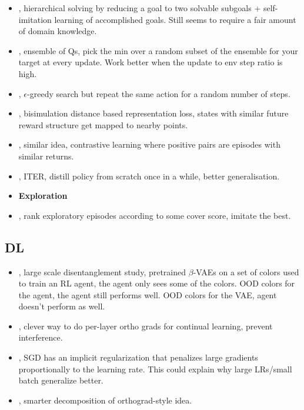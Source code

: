 \begin{itemize}
\item \citet{li2021solving}, hierarchical solving by reducing a goal to two solvable subgoals + self-imitation learning of accomplished goals. Still seems to require a fair amount of domain knowledge.
\item \citet{chen2021randomized}, ensemble of Qs, pick the min over a random subset of the ensemble for your target at every update. Work better when the update to env step ratio is high.
\item \citet{dabney2021temporallyextended}, $\epsilon$-greedy search but repeat the same action for a random number of steps.
\item \citet{zhang2021learning}, bisimulation distance based representation loss, states with similar future reward structure get mapped to nearby points.
  \item \citet{liu2021returnbased}, similar idea, contrastive learning where positive pairs are episodes with similar returns.
\item \citet{igl2021transient}, ITER, distill policy from scratch once in a while, better generalisation.
  
\item \textbf{Exploration}
\item \citet{zha2021rank}, rank exploratory episodes according to some cover score, imitate the best.
\end{itemize}

\subsection{DL}

\begin{itemize}
\item \citet{dittadi2021on}, large scale disentanglement study, pretrained $\beta$-VAEs on a set of colors used to train an RL agent, the agent only sees some of the colors. OOD colors for the agent, the agent still performs well. OOD colors for the VAE, agent doesn't perform as well.
\item \citet{saha2021gradient}, clever way to do per-layer ortho grads for continual learning, prevent interference.
\item \citet{smith2021on}, SGD has an implicit regularization that penalizes large gradients proportionally to the learning rate. This could explain why large LRs/small batch generalize better.
  \item \citet{dery2021auxiliary}, smarter decomposition of orthograd-style idea.
\end{itemize}








